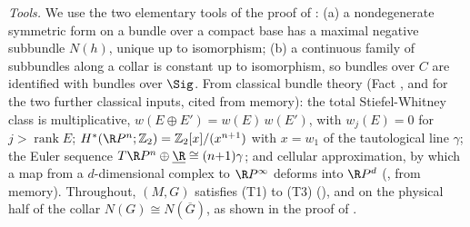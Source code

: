 \emph{Tools.} We use the two elementary tools of the proof of : (a) a nondegenerate symmetric form on a bundle over a compact base has a maximal negative subbundle $N(h)$, unique up to isomorphism; (b) a continuous family of subbundles along a collar is constant up to isomorphism, so bundles over $C$ are identified with bundles over $\Sig$. From classical bundle theory (Fact , and \cite[\S 4]{MilnorStasheff1974} for the two further classical inputs, cited from memory): the total Stiefel-Whitney class is multiplicative, $w(E \oplus E') = w(E)\,w(E')$, with $w_j(E) = 0$ for $j > \operatorname{rank} E$; $H^*(\R P^n; \mathbb{Z}_2) = \mathbb{Z}_2[x]/(x^{n+1})$ with $x = w_1$ of the tautological line $\gamma$; the Euler sequence $T\R P^n \oplus \underline{\R} \cong (n{+}1)\gamma$; and cellular approximation, by which a map from a $d$-dimensional complex to $\R P^\infty$ deforms into $\R P^d$ (\cite[\S\S 4--5]{MilnorStasheff1974}, from memory). Throughout, $(M,G)$ satisfies (T1) to (T3) (), and on the physical half of the collar $N(G) \cong N(\overline G)$, as shown in the proof of .

